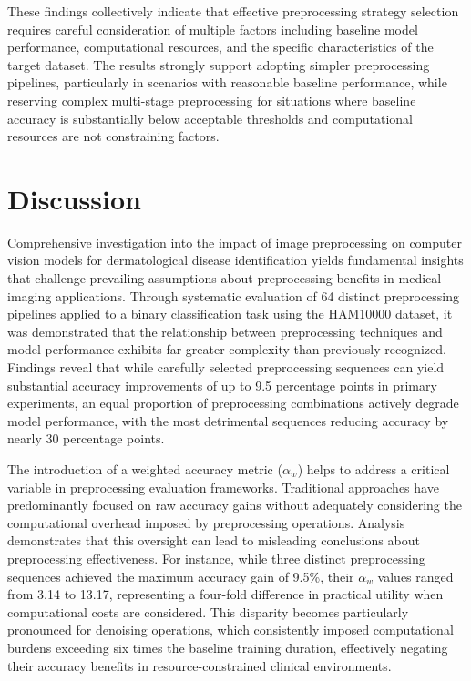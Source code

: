 \documentclass[journal]{IEEEtran}
\begin{document}
These findings collectively indicate that effective preprocessing strategy selection requires careful consideration of multiple factors including baseline model performance, computational resources, and the specific characteristics of the target dataset. The results strongly support adopting simpler preprocessing pipelines, particularly in scenarios with reasonable baseline performance, while reserving complex multi-stage preprocessing for situations where baseline accuracy is substantially below acceptable thresholds and computational resources are not constraining factors.

\section{Discussion}

Comprehensive investigation into the impact of image preprocessing on computer vision models for dermatological disease identification yields fundamental insights that challenge prevailing assumptions about preprocessing benefits in medical imaging applications. Through systematic evaluation of 64 distinct preprocessing pipelines applied to a binary classification task using the HAM10000 dataset, it was demonstrated that the relationship between preprocessing techniques and model performance exhibits far greater complexity than previously recognized. Findings reveal that while carefully selected preprocessing sequences can yield substantial accuracy improvements of up to 9.5 percentage points in primary experiments, an equal proportion of preprocessing combinations actively degrade model performance, with the most detrimental sequences reducing accuracy by nearly 30 percentage points.

The introduction of a weighted accuracy metric ($\alpha_w$) helps to address a critical variable in preprocessing evaluation frameworks. Traditional approaches have predominantly focused on raw accuracy gains without adequately considering the computational overhead imposed by preprocessing operations. Analysis demonstrates that this oversight can lead to misleading conclusions about preprocessing effectiveness. For instance, while three distinct preprocessing sequences achieved the maximum accuracy gain of 9.5\%, their $\alpha_w$ values ranged from 3.14 to 13.17, representing a four-fold difference in practical utility when computational costs are considered. This disparity becomes particularly pronounced for denoising operations, which consistently imposed computational burdens exceeding six times the baseline training duration, effectively negating their accuracy benefits in resource-constrained clinical environments.
\end{document}
